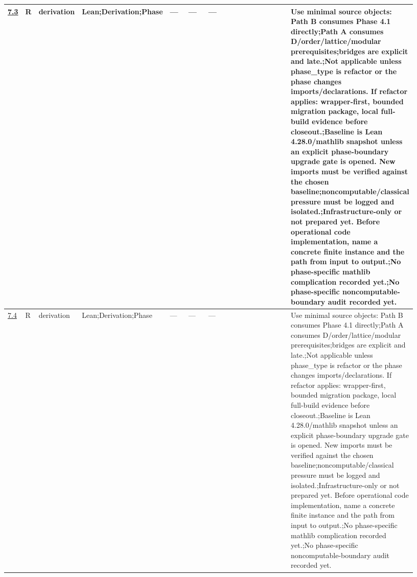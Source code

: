 \begin{longtable}{L{0.026\linewidth} L{0.024\linewidth} L{0.045\linewidth} L{0.07\linewidth} L{0.065\linewidth} L{0.075\linewidth} L{0.11\linewidth} L{0.19\linewidth} L{0.155\linewidth} L{0.17\linewidth}}
\hline
\addlinespace[0.24em]
\hyperlink{phase-row-7-3}{7.3} & R & derivation & Lean;\newline Derivation;\newline Phase & --- & --- & --- &  &  & Use minimal source objects: Path B consumes Phase 4.1 directly;\newline Path A consumes D/\allowbreak{}order/\allowbreak{}lattice/\allowbreak{}modular prerequisites;\newline bridges are explicit and late.;\newline Not applicable unless phase\_type is refactor or the phase changes imports/\allowbreak{}declarations. If refactor applies: wrapper-first, bounded migration package, local full-build evidence before closeout.;\newline Baseline is Lean 4.28.0/\allowbreak{}mathlib snapshot unless an explicit phase-boundary upgrade gate is opened. New imports must be verified against the chosen baseline;\newline noncomputable/\allowbreak{}classical pressure must be logged and isolated.;\newline Infrastructure-only or not prepared yet. Before operational code implementation, name a concrete finite instance and the path from input to output.;\newline No phase-specific mathlib complication recorded yet.;\newline No phase-specific noncomputable-boundary audit recorded yet.\\
\hline
\addlinespace[0.24em]
\hyperlink{phase-row-7-4}{7.4} & R & derivation & Lean;\newline Derivation;\newline Phase & --- & --- & --- &  &  & Use minimal source objects: Path B consumes Phase 4.1 directly;\newline Path A consumes D/\allowbreak{}order/\allowbreak{}lattice/\allowbreak{}modular prerequisites;\newline bridges are explicit and late.;\newline Not applicable unless phase\_type is refactor or the phase changes imports/\allowbreak{}declarations. If refactor applies: wrapper-first, bounded migration package, local full-build evidence before closeout.;\newline Baseline is Lean 4.28.0/\allowbreak{}mathlib snapshot unless an explicit phase-boundary upgrade gate is opened. New imports must be verified against the chosen baseline;\newline noncomputable/\allowbreak{}classical pressure must be logged and isolated.;\newline Infrastructure-only or not prepared yet. Before operational code implementation, name a concrete finite instance and the path from input to output.;\newline No phase-specific mathlib complication recorded yet.;\newline No phase-specific noncomputable-boundary audit recorded yet.\\

\end{longtable}
